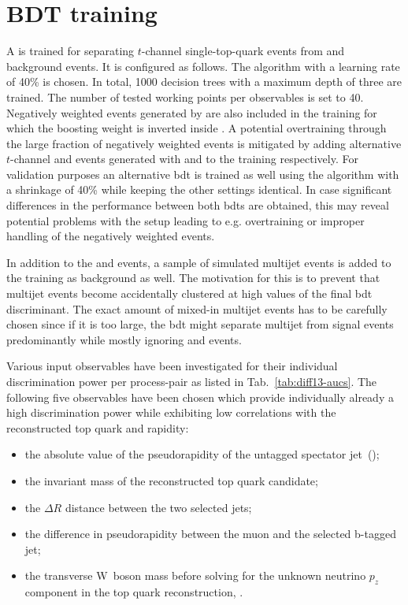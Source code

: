 \clearpage
\section{BDT training}
\label{sec:diff13-bdt}

A \bdt is trained for separating $t$-channel single-top-quark events from \wjets and \ttbar background events. It is configured as follows. The \ADABOOST algorithm with a learning rate of 40\% is chosen. In total, 1000 decision trees with a maximum depth of three are trained. The number of tested working points per observables is set to 40. Negatively weighted events generated by \MGAMC are also included in the training for which the boosting weight is inverted inside \TMVA. A potential overtraining through the large fraction of negatively weighted events is mitigated by adding alternative $t$-channel and \wjets events generated with \POWHEG and \MG to the training respectively. For validation purposes an alternative \gls{bdt} is trained as well  using the \GRADIENTBOOST algorithm with a shrinkage of 40\% while keeping the other settings identical. In case significant differences in the performance between both \glspl{bdt} are obtained, this may reveal potential problems with the setup leading to e.g. overtraining or improper handling of the negatively weighted events.

In addition to the \wjets and \ttbar events, a sample of simulated multijet events is added to the training as background as well. The motivation for this is to prevent that multijet events become accidentally clustered at high values of the final \gls{bdt} discriminant. The exact amount of mixed-in multijet events has to be carefully chosen since if it is too large, the \gls{bdt} might separate multijet from signal events predominantly while mostly ignoring \wjets and \ttbar events.

Various input observables have been investigated for their individual discrimination power per process-pair as listed in Tab.~\ref{tab:diff13-aucs}. The following five observables have been chosen which provide individually already a high discrimination power while exhibiting low correlations with the reconstructed top quark \pt and rapidity:

\begin{itemize}
\item the absolute value of the pseudorapidity of the untagged spectator jet~(\jprime);
\item the invariant mass of the reconstructed top quark candidate;
\item the $\Delta R$ distance between the two selected jets;
\item the difference in pseudorapidity between the muon and the selected b-tagged jet;
\item the transverse W~boson mass before solving for the unknown neutrino $p_{z}$ component in the top quark reconstruction, \mtw.
\end{itemize} 

